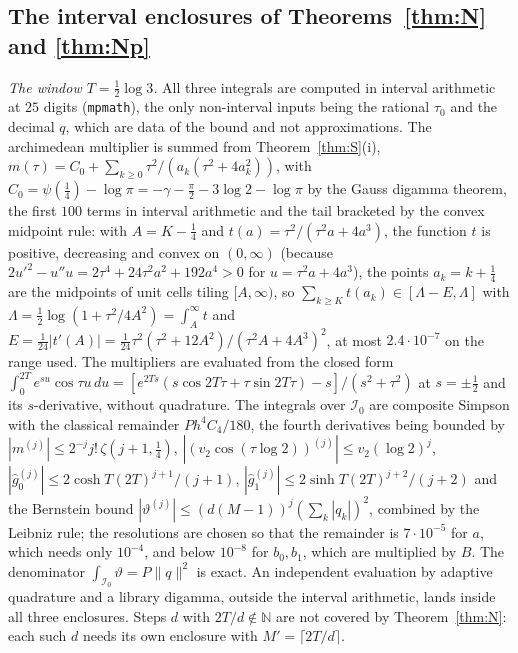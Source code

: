 \documentclass[11pt]{amsart}
\theoremstyle{definition}
\theoremstyle{remark}
\newcommand{\N}{\mathbb N}
\newcommand{\gh}[1]{\widehat g_{#1}}
\begin{document}
\subsection{The interval enclosures of Theorems~\ref{thm:N} and \ref{thm:Np}}
\emph{The window $T=\frac12\log3$.} All three integrals are computed in interval arithmetic at $25$ digits
(\texttt{mpmath}), the only non-interval inputs being the rational $\tau_0$ and the decimal $q$, which
are data of the bound and not approximations. The archimedean multiplier is summed from
Theorem~\ref{thm:S}(i), $m(\tau)=C_0+\sum_{k\ge0}\tau^2/(a_k(\tau^2+4a_k^2))$, with
$C_0=\psi(\frac14)-\log\pi=-\gamma-\frac\pi2-3\log2-\log\pi$ by the Gauss digamma theorem, the first
$100$ terms in interval arithmetic and the tail bracketed by the convex midpoint rule: with $A=K-\frac14$
and $t(a)=\tau^2/(\tau^2a+4a^3)$, the function $t$ is positive, decreasing and convex on $(0,\infty)$
(because $2u'^2-u''u=2\tau^4+24\tau^2a^2+192a^4>0$ for $u=\tau^2a+4a^3$), the points $a_k=k+\frac14$
are the midpoints of unit cells tiling $[A,\infty)$, so
$\sum_{k\ge K}t(a_k)\in[\Lambda-E,\Lambda]$ with $\Lambda=\frac12\log(1+\tau^2/4A^2)=\int_A^\infty t$
and $E=\frac1{24}|t'(A)|=\frac1{24}\tau^2(\tau^2+12A^2)/(\tau^2A+4A^3)^2$, at most $2.4\cdot10^{-7}$
on the range used. The multipliers are evaluated from the closed form
$\int_0^{2T}e^{su}\cos\tau u\,du=[e^{2Ts}(s\cos2T\tau+\tau\sin2T\tau)-s]/(s^2+\tau^2)$ at
$s=\pm\frac12$ and its $s$-derivative, without quadrature. The integrals over $\mathcal I_0$ are composite
Simpson with the classical remainder $Ph^4C_4/180$, the fourth derivatives being bounded by
$|m^{(j)}|\le2^{-j}j!\,\zeta(j+1,\frac14)$, $|(v_2\cos(\tau\log2))^{(j)}|\le v_2(\log2)^j$,
$|\gh0^{(j)}|\le2\cosh T(2T)^{j+1}/(j+1)$, $|\gh1^{(j)}|\le2\sinh T(2T)^{j+2}/(j+2)$ and the Bernstein
bound $|\vartheta^{(j)}|\le(d(M-1))^j(\sum_k|q_k|)^2$, combined by the Leibniz rule; the resolutions are
chosen so that the remainder is $7\cdot10^{-5}$ for $a$, which needs only $10^{-4}$, and below
$10^{-8}$ for $b_0,b_1$, which are multiplied by $B$. The denominator $\int_{\mathcal I_0}\vartheta=P\|q\|^2$ is
exact. An independent evaluation by adaptive quadrature and a library digamma, outside the interval
arithmetic, lands inside all three enclosures. Steps $d$ with $2T/d\notin\N$ are not covered by
Theorem~\ref{thm:N}: each such $d$ needs its own enclosure with $M'=\lceil2T/d\rceil$.
\end{document}
